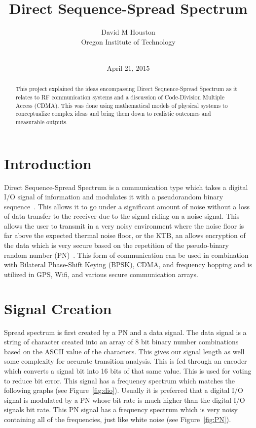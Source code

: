 \documentclass[journal]{IEEEtran}
\begin{document}
\title{Direct Sequence-Spread Spectrum}
\author{David M Houston\\
		Oregon Institute of Technology\\\\
		}
\date{April 21, 2015}

\maketitle

\begin{abstract}
This project explained the ideas encompassing Direct Sequence-Spread Spectrum as it relates to RF communication systems and a discussion of Code-Division Multiple Access (CDMA). This was done using mathematical models of physical systems to conceptualize complex ideas and bring them down to realistic outcomes and measurable outputs.
\end{abstract}

\section{Introduction}
Direct Sequence-Spread Spectrum is a communication type which takes a digital I/O signal of information and modulates it with a pseudorandom binary sequence~\cite{ECPS}. This allows it to go under a significant amount of noise without a loss of data transfer to the receiver due to the signal riding on a noise signal. This allows the user to transmit in a very noisy environment where the noise floor is far above the expected thermal noise floor, or the KTB, an allows encryption of the data which is very secure based on the repetition of the pseudo-binary random number (PN)~\cite{ECPS}. This form of communication can be used in combination with Bilateral Phase-Shift Keying (BPSK), CDMA, and frequency hopping and is utilized in GPS, Wifi, and various secure communication arrays. 

\section{Signal Creation}
Spread spectrum is first created by a PN and a data signal. The data signal is a string of character created into an array of 8 bit binary number combinations based on the ASCII value of the characters. This gives our signal length as well some complexity for accurate transition analysis. This is fed through an encoder which converts a signal bit into 16 bits of that same value. This is used for voting to reduce bit error. This signal has a frequency spectrum which matches the following graphs (see Figure~\ref{fig:dio}). Usually it is preferred that a digital I/O signal is modulated by a PN whose bit rate is much higher than the digital I/O signals bit rate. This PN signal has a frequency spectrum which is very noisy containing all of the frequencies, just like white noise (see Figure~\ref{fig:PN}).\\
\end{document}
